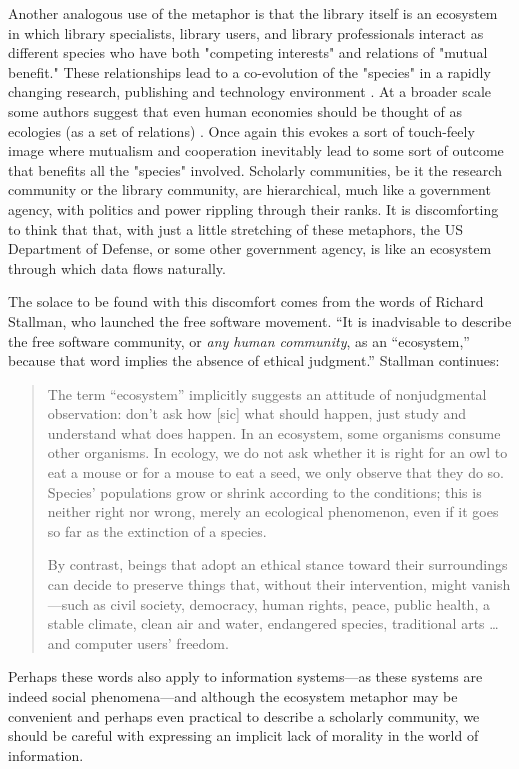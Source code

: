Another analogous use of the metaphor is that the library itself is an ecosystem in which library specialists, library users, and library professionals interact as different species who have both "competing interests" and relations of "mutual benefit." These relationships lead to a co-evolution of the "species" in a rapidly changing research, publishing and technology environment \citep{walter_2008}. At a broader scale some authors suggest that even human economies should be thought of as ecologies (as a set of relations) \citep[][p. 72]{lucas_2012}. Once again this evokes a sort of touch-feely image where mutualism and cooperation inevitably lead to some sort of outcome that benefits all the "species" involved. Scholarly communities, be it the research community or the library community, are hierarchical, much like a government agency, with politics and power rippling through their ranks. It is discomforting to think that that, with just a little stretching of these metaphors, the US Department of Defense, or some other government agency, is like an ecosystem through which data flows naturally. 

The solace to be found with this discomfort comes from the words of Richard Stallman, who launched the free software movement. “It is inadvisable to describe the free software community, or \textit{any human community}, as an “ecosystem,” because that word implies the absence of ethical judgment.”  Stallman continues:
 
\begin{quote}
The term “ecosystem” implicitly suggests an attitude of nonjudgmental observation: don't ask how [sic] what should happen, just study and understand what does happen. In an ecosystem, some organisms consume other organisms. In ecology, we do not ask whether it is right for an owl to eat a mouse or for a mouse to eat a seed, we only observe that they do so. Species' populations grow or shrink according to the conditions; this is neither right nor wrong, merely an ecological phenomenon, even if it goes so far as the extinction of a species.

By contrast, beings that adopt an ethical stance toward their surroundings can decide to preserve things that, without their intervention, might vanish—such as civil society, democracy, human rights, peace, public health, a stable climate, clean air and water, endangered species, traditional arts … and computer users' freedom. \citep{fsf_2014}
\end{quote}

Perhaps these words also apply to information systems—as these systems are indeed social phenomena—and although the ecosystem metaphor may be convenient and perhaps even practical to describe a scholarly community, we should be careful with expressing an implicit lack of morality in the world of information. 

